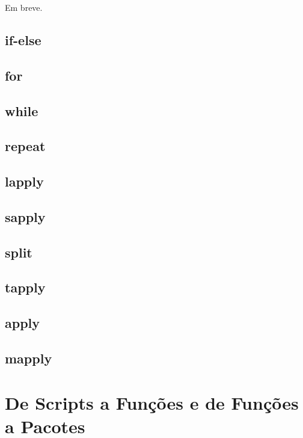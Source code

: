 \documentclass[]{book}
\theoremstyle{definition}
\theoremstyle{definition}
\theoremstyle{definition}
\theoremstyle{remark}
\begin{document}
Em breve.

\section{if-else}\label{if-else}

\section{for}\label{for}

\section{while}\label{while}

\section{repeat}\label{repeat}

\section{lapply}\label{lapply}

\section{sapply}\label{sapply}

\section{split}\label{split}

\section{tapply}\label{tapply}

\section{apply}\label{apply}

\section{mapply}\label{mapply}

\chapter{De Scripts a Funções e de Funções a Pacotes}\label{fx}
\end{document}
